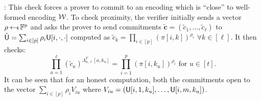 : This check forces a prover to commit
to an encoding which is ``close'' to well-formed encoding $\mathcal{W}$. To check proximity,  %
the verifier initially  sends a vector $\rho\hskip2.3pt{\gets\!\!\mbox{\tiny${\$}$\normalsize}}\,
\mathbb{F}^p$ and asks the prover to send commitments
$\tilde{\bm{c}} = (\tilde{c}_1,\ldots,\tilde{c}_\ell)$ to $\tilde{\mathsf{U}}=\sum_{i\in
[p]}\rho_i\mathsf{U}[i,\cdot,\cdot]$ computed as $\tilde{c}_k = \prod_{i\in[p]}(\pi[i,k])^{\rho_i}$ $\forall k\in[\ell]$. It then checks:
\begin{equation}\label{eq:proxchecks}
 \prod_{a=1}^\ell(\tilde{c}_a)^{\Lambda^T_{n,\ell}[a,k_u]}=\prod_{i=1}^p(\pi[i,k_u])^{\rho_i} 
\text{ for } u\in [t].
\end{equation} 
It can be
seen that for an honest computation, both the commitments open to the vector
$\sum_{i\in [p]}\rho_iV_{iu}$ where $V_{iu}=(\mathsf{U}[i,1,k_u],\ldots,\mathsf{U}[i,m,k_u])$.
\\
\vspace{-0.4cm}
